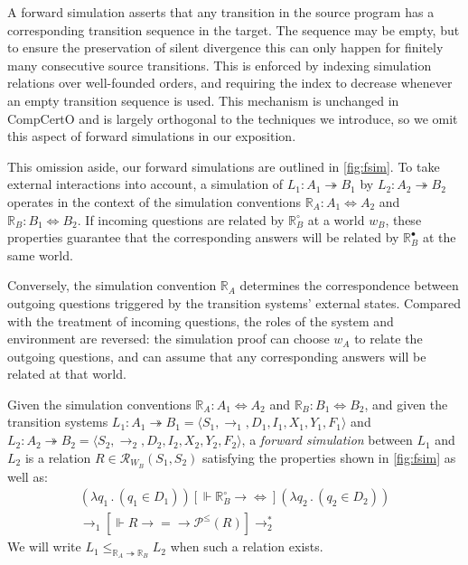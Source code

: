 \documentclass[sigplan,screen]{acmart}
\newcommand{\ifr}[1]{\mathrel{[{#1}]}}
\newcommand{\que}{\circ}
\newcommand{\ans}{\bullet}
\begin{document}
A forward simulation asserts that any transition in the source program
has a corresponding transition sequence in the target.
The sequence may be empty,
but to ensure the preservation of silent divergence
this can only happen for finitely many consecutive source transitions.
This is enforced by indexing simulation relations
over well-founded orders,
and requiring the index to decrease
whenever an empty transition sequence is used.
This mechanism is unchanged in CompCertO
and is largely orthogonal to the techniques we introduce,
so we omit this aspect of forward simulations
in our exposition.

This omission aside,
our forward simulations
are outlined in \autoref{fig:fsim}.
To take 
external interactions into account,
a simulation of
$L_1 : A_1 \twoheadrightarrow B_1$ by
$L_2 : A_2 \twoheadrightarrow B_2$
operates in the context of the simulation conventions
$\mathbb{R}_A : A_1 \Leftrightarrow A_2$ and
$\mathbb{R}_B : B_1 \Leftrightarrow B_2$.
If incoming questions %
are related by $\mathbb{R}_B^\que$
at a world $w_B$,
these properties guarantee that the corresponding answers will be related
by $\mathbb{R}_B^\ans$ at the same world.

Conversely,
the simulation convention $\mathbb{R}_A$
determines the correspondence between
outgoing questions triggered by
the transition systems' external states.
Compared with the treatment of incoming questions,
the roles of the system and environment are reversed:
the simulation proof can choose $w_A$
to relate the outgoing questions,
and can assume that any corresponding answers
will be related at that world.

\begin{definition} \label{def:fsim} %
Given
the simulation conventions
$\mathbb{R}_A : A_1 \Leftrightarrow A_2$ and
$\mathbb{R}_B : B_1 \Leftrightarrow B_2$,
and given
the transition systems
$L_1 : A_1 \twoheadrightarrow B_1 = \langle S_1, {\rightarrow}_1, D_1, I_1, X_1, Y_1, F_1 \rangle$ and
$L_2 : A_2 \twoheadrightarrow B_2 = \langle S_2, {\rightarrow}_2, D_2, I_2, X_2, Y_2, F_2 \rangle$,
a \emph{forward simulation} between $L_1$ and $L_2$
is a relation
$R \in \mathcal{R}_{W_B}(S_1, S_2)$
satisfying the properties shown in
\autoref{fig:fsim}
as well as:
\begin{gather*}
  (\lambda q_1 \, . \, (q_1 \in D_1))
  \ifr{\Vdash \mathbb{R}_B^\que \rightarrow {\Leftrightarrow}}
  (\lambda q_2 \, . \, (q_2 \in D_2))
  \\
  {\rightarrow_1}
  \ifr{\Vdash R \rightarrow {=} \rightarrow \mathcal{P}^\le(R)}
  {\rightarrow_2^*}
\end{gather*}
We will write $L_1 \le_{\mathbb{R}_A \twoheadrightarrow \mathbb{R}_B} L_2$
when such a relation exists.
\end{definition}
\end{document}

